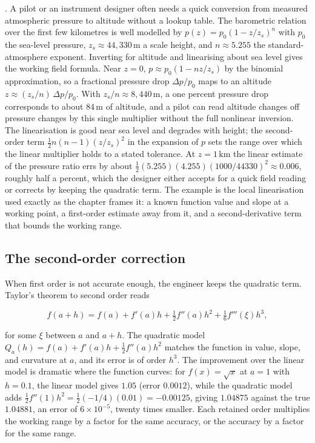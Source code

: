 . A pilot or an instrument designer often needs a quick
conversion from measured atmospheric pressure to altitude without a
lookup table. The barometric relation over the first few kilometres
is well modelled by $p(z) = p_{0}(1 - z/z_{s})^{n}$ with $p_{0}$ the
sea-level pressure, $z_{s} \approx 44{,}330\,\si{\meter}$ a scale
height, and $n \approx 5.255$ the standard-atmosphere exponent.
Inverting for altitude and linearising about sea level gives the
working field formula. Near $z = 0$, $p \approx p_{0}(1 - nz/z_{s})$
by the binomial approximation, so a fractional pressure drop
$\Delta p/p_{0}$ maps to an altitude $z \approx (z_{s}/n)\,
\Delta p/p_{0}$. With $z_{s}/n \approx 8{,}440\,\si{\meter}$, a one
percent pressure drop corresponds to about $84\,\si{\meter}$ of
altitude, and a pilot can read altitude changes off pressure changes
by this single multiplier without the full nonlinear inversion. The
linearisation is good near sea level and degrades with height; the
second-order term $\tfrac{1}{2}n(n-1)(z/z_{s})^{2}$ in the expansion
of $p$ sets the range over which the linear multiplier holds to a
stated tolerance. At $z = 1\,\si{\kilo\meter}$ the linear estimate of
the pressure ratio errs by about $\tfrac{1}{2}(5.255)(4.255)(1000/
44330)^{2} \approx 0.006$, roughly half a percent, which the designer
either accepts for a quick field reading or corrects by keeping the
quadratic term. The example is the local linearisation used exactly as
the chapter frames it: a known function value and slope at a working
point, a first-order estimate away from it, and a second-derivative
term that bounds the working range.

\subsection{The second-order correction}

When first order is not accurate enough, the engineer keeps the
quadratic term. Taylor's theorem to second order reads

\[
f(a + h) = f(a) + f'(a) h + \tfrac{1}{2} f''(a) h^{2} +
\tfrac{1}{6} f'''(\xi) h^{3},
\]

for some $\xi$ between $a$ and $a + h$. The quadratic model
$Q_{a}(h) = f(a) + f'(a) h + \tfrac{1}{2} f''(a) h^{2}$ matches the
function in value, slope, and curvature at $a$, and its error is of
order $h^{3}$. The improvement over the linear model is dramatic
where the function curves: for $f(x) = \sqrt{x}$ at $a = 1$ with
$h = 0.1$, the linear model gives $1.05$ (error $0.0012$), while the
quadratic model adds $\tfrac{1}{2} f''(1) h^{2} = \tfrac{1}{2}
(-1/4)(0.01) = -0.00125$, giving $1.04875$ against the true
$1.04881$, an error of $6 \times 10^{-5}$, twenty times smaller.
Each retained order multiplies the working range by a factor for
the same accuracy, or the accuracy by a factor for the same range.


